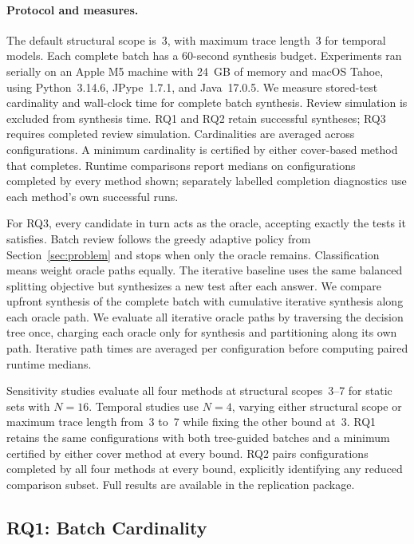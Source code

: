 \documentclass[runningheads]{llncs}
\begin{document}
\paragraph{Protocol and measures.}

The default structural scope is~3, with maximum trace length~3 for temporal
models. Each complete batch has a 60-second synthesis budget. Experiments ran
serially on an Apple M5 machine with 24~GB of memory and macOS Tahoe, using
Python~3.14.6, JPype~1.7.1, and Java~17.0.5. We measure
stored-test cardinality and wall-clock time for complete batch synthesis.
Review simulation is excluded from synthesis time. RQ1 and RQ2 retain
successful syntheses; RQ3 requires completed review simulation.
Cardinalities are averaged across configurations. A minimum
cardinality is certified by either cover-based method that completes. Runtime
comparisons report medians on configurations completed by every method shown;
separately labelled completion diagnostics use each method's own successful runs.

For RQ3, every candidate in turn acts as the oracle, accepting exactly the
tests it satisfies. Batch review follows the greedy adaptive policy from
Section~\ref{sec:problem} and stops when only the oracle remains.
Classification means weight oracle paths equally. The iterative baseline uses
the same balanced splitting objective but synthesizes a new test after each
answer. We compare upfront synthesis of the complete batch with cumulative
iterative synthesis along each oracle path. We evaluate all iterative oracle
paths by traversing the decision tree once,
charging each oracle only for synthesis and partitioning along its own path.
Iterative path times are averaged per configuration before computing paired
runtime medians.

Sensitivity studies evaluate all four methods at structural scopes~3--7 for
static sets with $N=16$. Temporal
studies use $N=4$, varying either structural scope or maximum trace length from~3 to~7
while fixing the other bound at~3. RQ1 retains the same configurations with
both tree-guided batches and a minimum certified by either cover method at
every bound. RQ2 pairs configurations completed by all four methods at every
bound, explicitly identifying any reduced comparison subset. Full results
are available in the replication package.

\subsection{RQ1: Batch Cardinality}
\label{sec:rq1}
\end{document}
